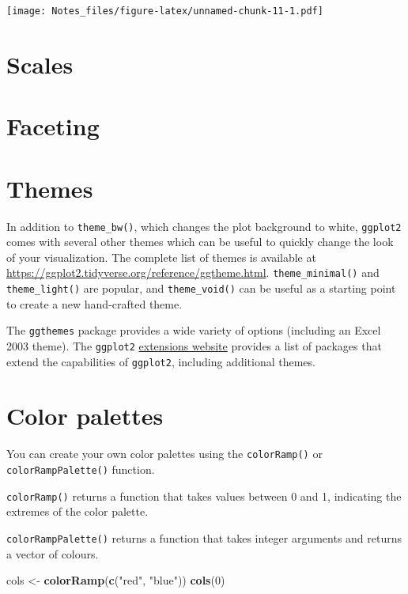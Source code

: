 \documentclass[
]{book}
\newenvironment{Shaded}{\begin{snugshade}}{\end{snugshade}}
\newcommand{\DecValTok}[1]{\textcolor[rgb]{0.00,0.00,0.81}{#1}}
\newcommand{\KeywordTok}[1]{\textcolor[rgb]{0.13,0.29,0.53}{\textbf{#1}}}
\newcommand{\NormalTok}[1]{#1}
\newcommand{\StringTok}[1]{\textcolor[rgb]{0.31,0.60,0.02}{#1}}
\begin{document}
\texttt{[image: Notes\_files/figure-latex/unnamed-chunk-11-1.pdf]}

\hypertarget{scales}{%
\section{Scales}\label{scales}}

\hypertarget{faceting}{%
\section{Faceting}\label{faceting}}

\hypertarget{themes}{%
\section{Themes}\label{themes}}

In addition to \texttt{theme\_bw()}, which changes the plot background to white, \texttt{ggplot2} comes with several other themes which can be useful to quickly change the look of your visualization. The complete list of themes is available at \url{https://ggplot2.tidyverse.org/reference/ggtheme.html}. \texttt{theme\_minimal()} and \texttt{theme\_light()} are popular, and \texttt{theme\_void()} can be useful as a starting point to create a new hand-crafted theme.

The \texttt{ggthemes} package provides a wide variety of options (including an Excel 2003 theme). The \texttt{ggplot2} \href{https://www.ggplot2-exts.org}{extensions website} provides a list of packages that extend the capabilities of \texttt{ggplot2}, including additional themes.

\hypertarget{color-palettes}{%
\section{Color palettes}\label{color-palettes}}

You can create your own color palettes using the \texttt{colorRamp()} or \texttt{colorRampPalette()} function.

\texttt{colorRamp()} returns a function that takes values between 0 and 1, indicating the extremes of the color palette.

\texttt{colorRampPalette()} returns a function that takes integer arguments and returns a vector of colours.

\begin{Shaded}
\begin{Highlighting}[]
\NormalTok{cols <-}\StringTok{ }\KeywordTok{colorRamp}\NormalTok{(}\KeywordTok{c}\NormalTok{(}\StringTok{"red"}\NormalTok{, }\StringTok{"blue"}\NormalTok{))}
\KeywordTok{cols}\NormalTok{(}\DecValTok{0}\NormalTok{)}
\end{Highlighting}
\end{Shaded}
\end{document}

